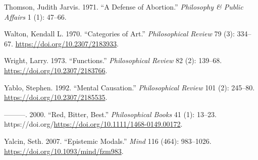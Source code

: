 \documentclass[
  12pt,
  letterpaper,
  DIV=11,
  numbers=noendperiod]{scrartcl}
\newlength{\cslhangindent}
\newenvironment{CSLReferences}[2] %
 {\begin{list}{}{%
  \setlength{\itemindent}{0pt}
  \setlength{\leftmargin}{0pt}
  \setlength{\parsep}{0pt}
  \ifodd #1
   \setlength{\leftmargin}{\cslhangindent}
   \setlength{\itemindent}{-1\cslhangindent}
  \fi
  \setlength{\itemsep}{#2\baselineskip}}}
 {\end{list}}
\begin{document}
\begin{CSLReferences}{1}{0}
Thomson, Judith Jarvis. 1971. {``A Defense of Abortion.''}
\emph{Philosophy \& Public Affairs} 1 (1): 47--66.

Walton, Kendall L. 1970. {``Categories of Art.''} \emph{Philosophical
Review} 79 (3): 334--67. \url{https://doi.org/10.2307/2183933}.

Wright, Larry. 1973. {``Functions.''} \emph{Philosophical Review} 82
(2): 139--68. \url{https://doi.org/10.2307/2183766}.

Yablo, Stephen. 1992. {``Mental Causation.''} \emph{Philosophical
Review} 101 (2): 245--80. \url{https://doi.org/10.2307/2185535}.

---------. 2000. {``Red, Bitter, Best.''} \emph{Philosophical Books} 41
(1): 13--23.
https://doi.org/\url{https://doi.org/10.1111/1468-0149.00172}.

Yalcin, Seth. 2007. {``Epistemic Modals.''} \emph{Mind} 116 (464):
983--1026. \url{https://doi.org/10.1093/mind/fzm983}.

\end{CSLReferences}
\end{document}
